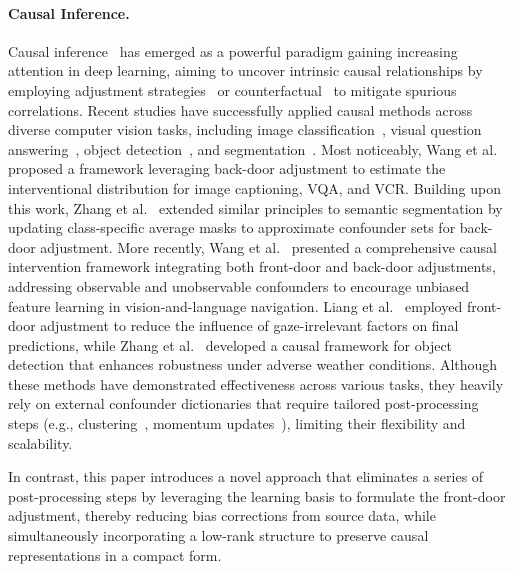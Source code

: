 \paragraph{Causal Inference.}
Causal inference~\cite{pearl2016causal,neuberg2003causality} has emerged as a powerful paradigm gaining increasing attention in deep learning, aiming to uncover intrinsic 
causal relationships by employing adjustment strategies~\cite{liu2023cross,yang2021deconfounded} or counterfactual~\cite{weng2024fast,niu2021counterfactual,parvaneh2020counterfactual} to mitigate spurious correlations. 
Recent studies have successfully applied causal methods across diverse computer vision tasks, including image classification~\cite{chalupka2014visual,lopez2017discovering}, 
visual question answering~\cite{liu2023cross,yang2021deconfounded,wang2020visual}, object detection~\cite{zhang2022multiple}, and segmentation~\cite{zhang2020causal,shao2021improving}.
Most noticeably,
Wang et al.~\cite{wang2020visual} proposed a framework leveraging back-door adjustment to estimate the interventional distribution for image captioning, VQA, and VCR. 
Building upon this work, Zhang et al.~\cite{zhang2020causal} extended similar principles to semantic segmentation by updating class-specific average masks to approximate confounder sets
for back-door adjustment. More recently, Wang et al.~\cite{wang2024vision} presented a comprehensive causal intervention framework integrating both front-door and back-door adjustments,
addressing observable and unobservable confounders to encourage unbiased feature learning in vision-and-language navigation. 
Liang et al.~\cite{liang2024confounded} employed front-door adjustment to reduce the influence of gaze-irrelevant factors on final predictions, 
while Zhang et al.~\cite{zhang2022multiple} developed a causal framework for object detection that enhances robustness under adverse weather conditions. Although these methods have demonstrated effectiveness across various tasks, they heavily rely on external confounder dictionaries that require tailored post-processing steps 
(e.g., clustering~\cite{zhang2020causal}, momentum updates~\cite{liang2024confounded}), limiting their flexibility and scalability.
 
In contrast, this paper introduces a novel approach that eliminates a series of post-processing steps by leveraging the learning basis to formulate the front-door adjustment, thereby reducing bias corrections from source data, while simultaneously incorporating a low-rank structure to preserve causal representations in a compact form.
\vspace{-1mm}